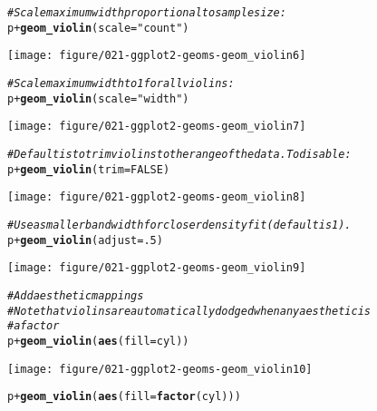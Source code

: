 \documentclass[a4paper,titlepage]{tufte-handout}\usepackage[]{graphicx}\usepackage[]{color}
\makeatletter
\def\maxwidth{ %
  \ifdim\Gin@nat@width>\linewidth
    \linewidth
  \else
    \Gin@nat@width
  \fi
}
\newcommand{\hlnum}[1]{\textcolor[rgb]{0.686,0.059,0.569}{#1}}%
\newcommand{\hlstr}[1]{\textcolor[rgb]{0.192,0.494,0.8}{#1}}%
\newcommand{\hlcom}[1]{\textcolor[rgb]{0.678,0.584,0.686}{\textit{#1}}}%
\newcommand{\hlopt}[1]{\textcolor[rgb]{0,0,0}{#1}}%
\newcommand{\hlstd}[1]{\textcolor[rgb]{0.345,0.345,0.345}{#1}}%
\newcommand{\hlkwc}[1]{\textcolor[rgb]{0.333,0.667,0.333}{#1}}%
\newcommand{\hlkwd}[1]{\textcolor[rgb]{0.737,0.353,0.396}{\textbf{#1}}}%
\newenvironment{kframe}{%
 \def\at@end@of@kframe{}%
 \ifinner\ifhmode%
  \def\at@end@of@kframe{\end{minipage}}%
  \begin{minipage}{\columnwidth}%
 \fi\fi%
 \def\FrameCommand##1{\hskip\@totalleftmargin \hskip-\fboxsep
 \colorbox{shadecolor}{##1}\hskip-\fboxsep
     \hskip-\linewidth \hskip-\@totalleftmargin \hskip\columnwidth}%
 \MakeFramed {\advance\hsize-\width
   \@totalleftmargin\z@ \linewidth\hsize
   \@setminipage}}%
 {\par\unskip\endMakeFramed%
 \at@end@of@kframe}
\newenvironment{knitrout}{}{} %
\makeatother
\begin{document}
\begin{knitrout}
\begin{kframe}\begin{alltt}
\hlcom{# Scale maximum width proportional to sample size:}
\hlstd{p} \hlopt{+} \hlkwd{geom_violin}\hlstd{(}\hlkwc{scale} \hlstd{=} \hlstr{"count"}\hlstd{)}
\end{alltt}
\end{kframe}
\texttt{[image: figure/021-ggplot2-geoms-geom\_violin6]} 
\begin{kframe}\begin{alltt}
\hlcom{# Scale maximum width to 1 for all violins:}
\hlstd{p} \hlopt{+} \hlkwd{geom_violin}\hlstd{(}\hlkwc{scale} \hlstd{=} \hlstr{"width"}\hlstd{)}
\end{alltt}
\end{kframe}
\texttt{[image: figure/021-ggplot2-geoms-geom\_violin7]} 
\begin{kframe}\begin{alltt}
\hlcom{# Default is to trim violins to the range of the data. To disable:}
\hlstd{p} \hlopt{+} \hlkwd{geom_violin}\hlstd{(}\hlkwc{trim} \hlstd{=} \hlnum{FALSE}\hlstd{)}
\end{alltt}
\end{kframe}
\texttt{[image: figure/021-ggplot2-geoms-geom\_violin8]} 
\begin{kframe}\begin{alltt}
\hlcom{# Use a smaller bandwidth for closer density fit (default is 1).}
\hlstd{p} \hlopt{+} \hlkwd{geom_violin}\hlstd{(}\hlkwc{adjust} \hlstd{=} \hlnum{.5}\hlstd{)}
\end{alltt}
\end{kframe}
\texttt{[image: figure/021-ggplot2-geoms-geom\_violin9]} 
\begin{kframe}\begin{alltt}
\hlcom{# Add aesthetic mappings}
\hlcom{# Note that violins are automatically dodged when any aesthetic is}
\hlcom{# a factor}
\hlstd{p} \hlopt{+} \hlkwd{geom_violin}\hlstd{(}\hlkwd{aes}\hlstd{(}\hlkwc{fill} \hlstd{= cyl))}
\end{alltt}
\end{kframe}
\texttt{[image: figure/021-ggplot2-geoms-geom\_violin10]} 
\begin{kframe}\begin{alltt}
\hlstd{p} \hlopt{+} \hlkwd{geom_violin}\hlstd{(}\hlkwd{aes}\hlstd{(}\hlkwc{fill} \hlstd{=} \hlkwd{factor}\hlstd{(cyl)))}
\end{alltt}
\end{kframe}

\end{knitrout}
\end{document}
